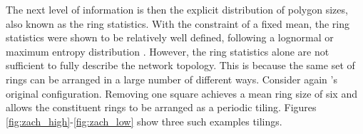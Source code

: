 The next level of information is then the explicit distribution of polygon sizes, also known as the ring statistics.
With the constraint of a fixed mean, the ring statistics were shown to be relatively well defined, following a lognormal or maximum entropy distribution \cite{Shackelford1981,Lemaitre1993,Lichtenstein2012}.
However, the ring statistics alone are not sufficient to fully describe the network topology. 
This is because the same set of rings can be arranged in a large number of different ways.
Consider again \zach's original configuration. 
Removing one square achieves a mean ring size of six and allows the constituent rings to be arranged as a periodic tiling.
Figures \ref{fig:zach_high}\--\ref{fig:zach_low} show three such examples tilings.


\begin{figure}[h]
     \centering
     

\end{figure}
